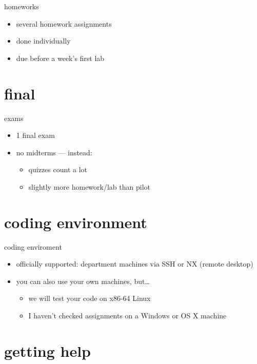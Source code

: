 \begin{frame}{homeworks}
    \begin{itemize}
    \item several homework assignments
    \item done individually
    \item due before a week's first lab
    \end{itemize}
\end{frame}

\section{final}

\begin{frame}{exams}
    \begin{itemize}
    \item 1 final exam
    \item no midterms --- instead:
        \begin{itemize}
        \item quizzes count a lot
        \item slightly more homework/lab than pilot
        \end{itemize}
    \end{itemize}
\end{frame}

\section{coding environment}

\begin{frame}{coding enviroment}
    \begin{itemize}
    \item officially supported: department machines via SSH or NX (remote desktop)
    \item you can also use your own machines, but\ldots
        \begin{itemize}
        \item we will test your code on x86-64 Linux
        \item I haven't checked assignments on a Windows or OS X machine
        \end{itemize}
    \end{itemize}
\end{frame}


\section{getting help}

